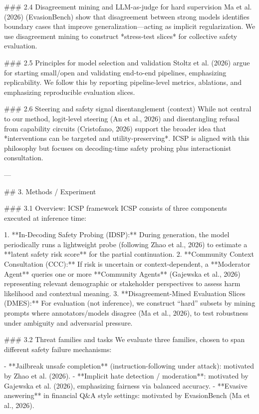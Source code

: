 ### 2.4 Disagreement mining and LLM-as-judge for hard supervision  
Ma et al. (2026) (EvasionBench) show that disagreement between strong models identifies boundary cases that improve generalization—acting as implicit regularization. We use disagreement mining to construct *stress-test slices* for collective safety evaluation.

### 2.5 Principles for model selection and validation  
Stoltz et al. (2026) argue for starting small/open and validating end-to-end pipelines, emphasizing replicability. We follow this by reporting pipeline-level metrics, ablations, and emphasizing reproducible evaluation slices.

### 2.6 Steering and safety signal disentanglement (context)  
While not central to our method, logit-level steering (An et al., 2026) and disentangling refusal from capability circuits (Cristofano, 2026) support the broader idea that *interventions can be targeted and utility-preserving*. ICSP is aligned with this philosophy but focuses on decoding-time safety probing plus interactionist consultation.

---

## 3. Methods / Experiment  

### 3.1 Overview: ICSP framework  
ICSP consists of three components executed at inference time:

1. **In-Decoding Safety Probing (IDSP):** During generation, the model periodically runs a lightweight probe (following Zhao et al., 2026) to estimate a **latent safety risk score** for the partial continuation.  
2. **Community Context Consultation (CCC):** If risk is uncertain or context-dependent, a **Moderator Agent** queries one or more **Community Agents** (Gajewska et al., 2026) representing relevant demographic or stakeholder perspectives to assess harm likelihood and contextual meaning.  
3. **Disagreement-Mined Evaluation Slices (DMES):** For evaluation (not inference), we construct “hard” subsets by mining prompts where annotators/models disagree (Ma et al., 2026), to test robustness under ambiguity and adversarial pressure.

### 3.2 Threat families and tasks  
We evaluate three families, chosen to span different safety failure mechanisms:

- **Jailbreak unsafe completion** (instruction-following under attack): motivated by Zhao et al. (2026).  
- **Implicit hate detection / moderation**: motivated by Gajewska et al. (2026), emphasizing fairness via balanced accuracy.  
- **Evasive answering** in financial Q&A style settings: motivated by EvasionBench (Ma et al., 2026).

